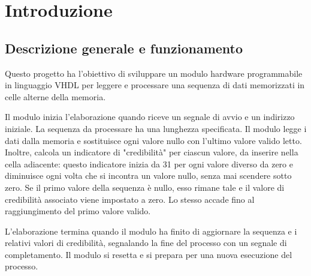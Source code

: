 \raggedright
\section{Introduzione}
\subsection{Descrizione generale e funzionamento}
\par Questo progetto ha l'obiettivo di sviluppare un modulo hardware programmabile in linguaggio VHDL per leggere e processare una sequenza di dati memorizzati in celle alterne della memoria.
\par Il modulo inizia l'elaborazione quando riceve un segnale di avvio e un indirizzo iniziale.
  La sequenza da processare ha una lunghezza specificata.
  Il modulo legge i dati dalla memoria e sostituisce ogni valore nullo con l'ultimo valore valido letto. Inoltre, calcola un indicatore di "credibilità" per ciascun valore, da inserire nella cella adiacente: questo indicatore inizia da 31 per ogni valore diverso da zero e diminuisce ogni volta che si incontra un valore nullo, senza mai scendere sotto zero.
  Se il primo valore della sequenza è nullo, esso rimane tale e il valore di credibilità associato viene impostato a zero. Lo stesso accade fino al raggiungimento del primo valore valido.
\par L'elaborazione termina quando il modulo ha finito di aggiornare la sequenza e i relativi valori di credibilità, segnalando la fine del processo con un segnale di completamento. Il modulo si resetta e si prepara per una nuova esecuzione del processo.
